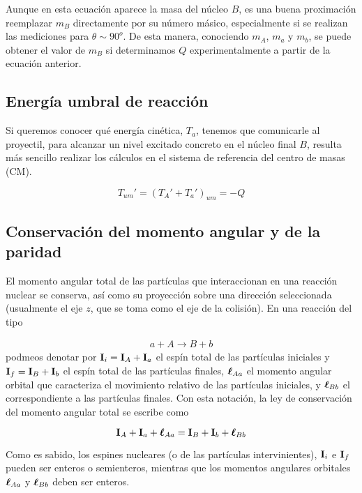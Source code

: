 Aunque en esta ecuación aparece la masa del núcleo $B$, es una buena proximación reemplazar $m_B$ directamente por su número másico, especialmente si se realizan las mediciones para $\theta \sim 90^{\textit{o}}$. De esta manera, conociendo $m_A$, $m_a$ y $m_b$, se puede obtener el valor de $m_B$ si determinamos $Q$ experimentalmente a partir de la ecuación anterior.


\subsection{Energía umbral de reacción}

Si queremos conocer qué energía cinética, $T_a$, tenemos que comunicarle al proyectil, para alcanzar un nivel excitado concreto en el núcleo final $B$, resulta más sencillo realizar los cálculos en el sistema de referencia del centro de masas (CM).  

\begin{mybox}
	\begin{equation}
		T_{um}' = (T_A'+T_a')_{um} = - Q
	\end{equation}	
\end{mybox}

\subsection{Conservación del momento angular y de la paridad}

El momento angular total de las partículas que interaccionan en una reacción nuclear se conserva, así como su proyección sobre una dirección seleccionada (usualmente el eje $z$, que se toma como el eje de la colisión). En una reacción del tipo 

\begin{eqnarray}
    a + A \longrightarrow B + b
\end{eqnarray}
podmeos denotar por $\mathbf{I}_i = \mathbf{I}_A + \mathbf{I}_a$ el espín total de las partículas iniciales y $\mathbf{I}_f=\mathbf{I}_B + \mathbf{I}_b$ el espín total de las partículas finales, $\boldsymbol{\ell}_{Aa}$ el momento angular orbital que caracteriza el movimiento relativo de las partículas iniciales, y $\boldsymbol{\ell}_{Bb}$ el correspondiente a las partículas finales. Con esta notación, la ley de conservación del momento angular total se escribe como 

\begin{mybox}
\begin{equation}
    \mathbf{I}_A + \mathbf{I}_a + \boldsymbol{\ell}_{Aa} = \mathbf{I}_B + \mathbf{I}_b + \boldsymbol{\ell}_{Bb} 
\end{equation}
\end{mybox}
Como es sabido, los espines nucleares (o de las partículas intervinientes), $\mathbf{I}_i$ e $\mathbf{I}_f$ pueden ser enteros o semienteros, mientras que los momentos angulares orbitales $\boldsymbol{\ell}_{Aa}$ y $\boldsymbol{\ell}_{Bb}$ deben ser enteros. \\

